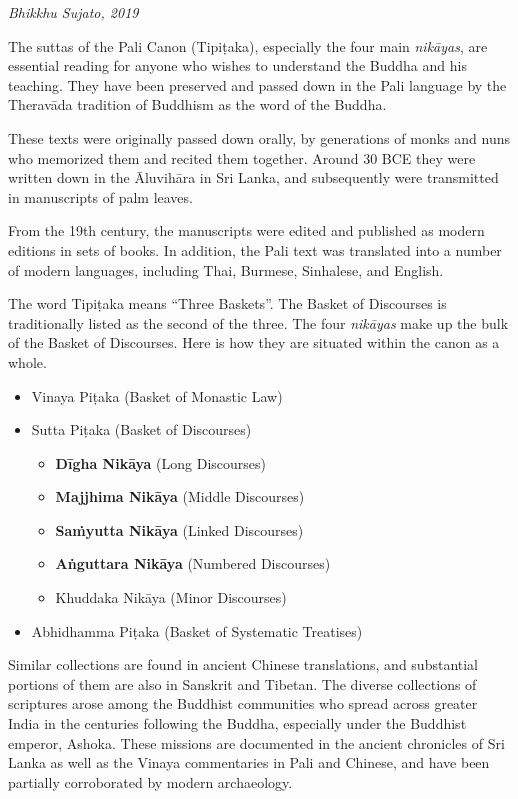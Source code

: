 \documentclass[12pt,openany]{book}%
\newcommand*{\scbyline}[1]{\begin{flushright}\textit{#1}\end{flushright}\bigskip}
\begin{document}
\scbyline{Bhikkhu Sujato, 2019}

The suttas of the Pali Canon (\textsanskrit{Tipiṭaka}), especially the four main \textit{\textsanskrit{nikāyas}}, are essential reading for anyone who wishes to understand the Buddha and his teaching. They have been preserved and passed down in the Pali language by the \textsanskrit{Theravāda} tradition of Buddhism as the word of the Buddha.

These texts were originally passed down orally, by generations of monks and nuns who memorized them and recited them together. Around 30 BCE they were written down in the \textsanskrit{Āluvihāra} in Sri Lanka, and subsequently were transmitted in manuscripts of palm leaves.

From the 19th century, the manuscripts were edited and published as modern editions in sets of books. In addition, the Pali text was translated into a number of modern languages, including Thai, Burmese, Sinhalese, and English.

The word \textsanskrit{Tipiṭaka} means “Three Baskets”. The Basket of Discourses is traditionally listed as the second of the three. The four \textit{\textsanskrit{nikāyas}} make up the bulk of the Basket of Discourses. Here is how they are situated within the canon as a whole.

\begin{itemize}%
\item Vinaya \textsanskrit{Piṭaka} (Basket of Monastic Law)%
\item Sutta \textsanskrit{Piṭaka} (Basket of Discourses)
\begin{itemize}%
\item \textbf{\textsanskrit{Dīgha} \textsanskrit{Nikāya}} (Long Discourses)%
\item \textbf{Majjhima \textsanskrit{Nikāya}} (Middle Discourses)%
\item \textbf{\textsanskrit{Saṁyutta} \textsanskrit{Nikāya}} (Linked Discourses)%
\item \textbf{\textsanskrit{Aṅguttara} \textsanskrit{Nikāya}} (Numbered Discourses)%
\item Khuddaka \textsanskrit{Nikāya} (Minor Discourses)%
\end{itemize}

%
\item Abhidhamma \textsanskrit{Piṭaka} (Basket of Systematic Treatises)%
\end{itemize}

Similar collections are found in ancient Chinese translations, and substantial portions of them are also in Sanskrit and Tibetan. The diverse collections of scriptures arose among the Buddhist communities who spread across greater India in the centuries following the Buddha, especially under the Buddhist emperor, Ashoka. These missions are documented in the ancient chronicles of Sri Lanka as well as the Vinaya commentaries in Pali and Chinese, and have been partially corroborated by modern archaeology.
\end{document}
